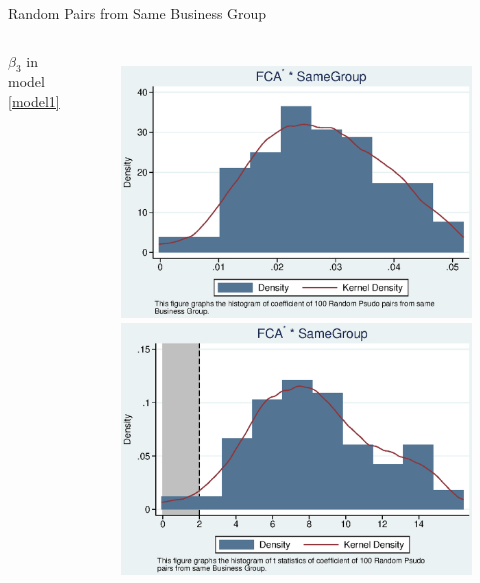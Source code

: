 \documentclass{beamer}
\begin{document}
	
	\begin{frame}{Random Pairs from Same Business Group}
		
		\begin{columns}\centering
			\column{\textwidth}
			\begin{center}
				$ \beta_3 $ in model \ref{model1}
			\end{center}
			
			\begin{figure}
				\centering
				\includegraphics[width=0.45\linewidth]{BusinessPseudoSBFCA.eps}
				\includegraphics[width=0.45\linewidth]{BusinessPseudoSBFCA_t.eps}
			\end{figure}
			
			
		\end{columns}
	\end{frame}
	
\end{document}
